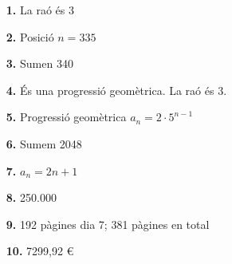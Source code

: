 \documentclass[a4paper, pdf, twoside]{book}
\begin{document}
\begin{multicols}{2}
\begin{enumerate}
 \end{enumerate}
\begin{enumerate}
\vspace{0.25cm}
\item[\fontfamily{phv}\selectfont\color{blue}\textbf{1. }]  \scalebox{0.6}{\simbolclau } 
La raó és 3
\vspace{0.25cm}
\item[\fontfamily{phv}\selectfont\color{blue}\textbf{2. }]  \scalebox{0.6}{\simbolclau } 
Posició $n=335$
\vspace{0.25cm}
\item[\fontfamily{phv}\selectfont\color{blue}\textbf{3. }]  \scalebox{0.6}{\simbolclau } 
Sumen 340
\vspace{0.25cm}
\item[\fontfamily{phv}\selectfont\color{blue}\textbf{4. }]  \scalebox{0.6}{\simbolclau } 
És una progressió geomètrica. La raó és 3.
\vspace{0.25cm}
\item[\fontfamily{phv}\selectfont\color{blue}\textbf{5. }]  \scalebox{0.6}{\simbolclau } 
Progressió geomètrica $a_{n} = 2·5^{n-1}$ 
\vspace{0.25cm}
\item[\fontfamily{phv}\selectfont\color{blue}\textbf{6. }]  \scalebox{0.6}{\simbolclau } 
Sumem 2048
\vspace{0.25cm}
\item[\fontfamily{phv}\selectfont\color{blue}\textbf{7. }]  \scalebox{0.6}{\simbolclau } 
 $a_{ n} = 2n + 1$ 
\vspace{0.25cm}
\item[\fontfamily{phv}\selectfont\color{blue}\textbf{8. }]  \scalebox{0.6}{\simbolclau } 
250.000
\vspace{0.25cm}
\item[\fontfamily{phv}\selectfont\color{blue}\textbf{9. }]  \scalebox{0.6}{\simbolclau } 
192 pàgines dia 7; 381 pàgines en total
\vspace{0.25cm}
\item[\fontfamily{phv}\selectfont\color{blue}\textbf{10. }]  \scalebox{0.6}{\simbolclau } 
7299,92 \euro {}
 \end{enumerate}
\vfill\null
\columnbreak
\def\currentname{Solucions del Tema 4}
\vspace*{0.75cm}

 

\vspace*{0.4cm}
 {}
\vspace{0.3cm}


\end{multicols}
\end{document}
